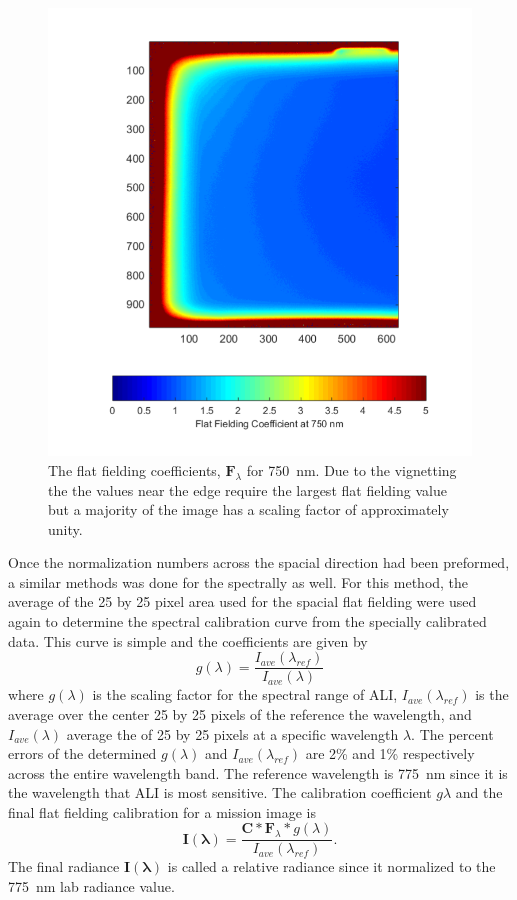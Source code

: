 \begin{figure}
    \includegraphics[width=1.0\textwidth]{./Images/5-2-FlatFieldCoeff.pdf}
    \caption[750~nm Flat Feilding Coefficients]{The flat fielding coefficients, $\mathbf{F}_{\lambda}$ for 750~nm. Due to the vignetting the the values near the edge require the largest flat fielding value but a majority of the image has a scaling factor of approximately unity. }
    \label{fig:5.2:flatFieldCoeff}
\end{figure}

Once the normalization numbers across the spacial direction had been preformed, a similar methods was done for the spectrally as well. For this method, the average of the 25 by 25 pixel area used for the spacial flat fielding were used again to determine the spectral calibration curve from the specially calibrated data. This curve is simple and the coefficients are given by
\begin{equation}
    g(\lambda) = \frac{I_{ave}(\lambda_{ref})}{I_{ave}(\lambda)} 
\end{equation} 
where $g(\lambda)$ is the scaling factor for the spectral range of ALI, $I_{ave}(\lambda_{ref})$ is the average over the center 25 by 25 pixels of the reference the wavelength, and $I_{ave}(\lambda)$ average the of 25 by 25 pixels at a specific wavelength $\lambda$. The percent errors of the determined $g(\lambda)$ and $I_{ave}(\lambda_{ref})$ are 2\% and 1\% respectively across the entire wavelength band. The reference wavelength is 775~nm since it is the wavelength that ALI is most sensitive. The calibration coefficient $g{\lambda}$ and the final flat fielding calibration for a mission image is
\begin{equation}
    \mathbf{I(\lambda)} = \frac{\mathbf{C}*\mathbf{F}_{\lambda}*g(\lambda)}{I_{ave}(\lambda_{ref})}.
\end{equation}
The final radiance $\mathbf{I(\lambda)}$ is called a relative radiance since it normalized to the 775~nm lab radiance value.

